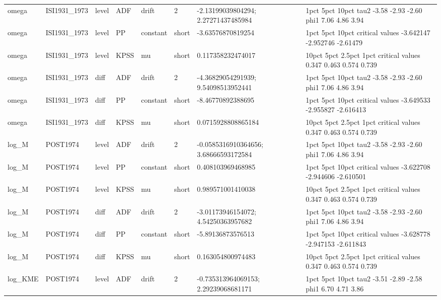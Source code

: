 \begin{tabular}{llllllll}
omega & ISI1931\_1973 & level & ADF & drift & 2 & -2.13199039804294; 2.27271437485984 &       1pct  5pct 10pct tau2 -3.58 -2.93 -2.60 phi1  7.06  4.86  3.94 \\
omega & ISI1931\_1973 & level & PP & constant & short & -3.63576870819254 &                      1pct      5pct    10pct critical values -3.642147 -2.952746 -2.61479 \\
omega & ISI1931\_1973 & level & KPSS & mu & short & 0.117358232474017 &                 10pct  5pct 2.5pct  1pct critical values 0.347 0.463  0.574 0.739 \\
omega & ISI1931\_1973 & diff & ADF & drift & 2 & -4.36829054291939; 9.54098513952441 &       1pct  5pct 10pct tau2 -3.58 -2.93 -2.60 phi1  7.06  4.86  3.94 \\
omega & ISI1931\_1973 & diff & PP & constant & short & -8.46770892388695 &                      1pct      5pct     10pct critical values -3.649533 -2.955827 -2.616413 \\
omega & ISI1931\_1973 & diff & KPSS & mu & short & 0.0715928808865184 &                 10pct  5pct 2.5pct  1pct critical values 0.347 0.463  0.574 0.739 \\
log\_M & POST1974 & level & ADF & drift & 2 & -0.0585316910364656; 3.68666593172584 &       1pct  5pct 10pct tau2 -3.58 -2.93 -2.60 phi1  7.06  4.86  3.94 \\
log\_M & POST1974 & level & PP & constant & short & 0.408103969468985 &                      1pct      5pct     10pct critical values -3.622708 -2.944606 -2.610501 \\
log\_M & POST1974 & level & KPSS & mu & short & 0.989571001410038 &                 10pct  5pct 2.5pct  1pct critical values 0.347 0.463  0.574 0.739 \\
log\_M & POST1974 & diff & ADF & drift & 2 & -3.01173946154072; 4.54250363957682 &       1pct  5pct 10pct tau2 -3.58 -2.93 -2.60 phi1  7.06  4.86  3.94 \\
log\_M & POST1974 & diff & PP & constant & short & -5.89136873576513 &                      1pct      5pct     10pct critical values -3.628778 -2.947153 -2.611843 \\
log\_M & POST1974 & diff & KPSS & mu & short & 0.163054800974483 &                 10pct  5pct 2.5pct  1pct critical values 0.347 0.463  0.574 0.739 \\
log\_KME & POST1974 & level & ADF & drift & 2 & -0.735313964069153; 2.29239068681171 &       1pct  5pct 10pct tau2 -3.51 -2.89 -2.58 phi1  6.70  4.71  3.86 \\

\end{tabular}
